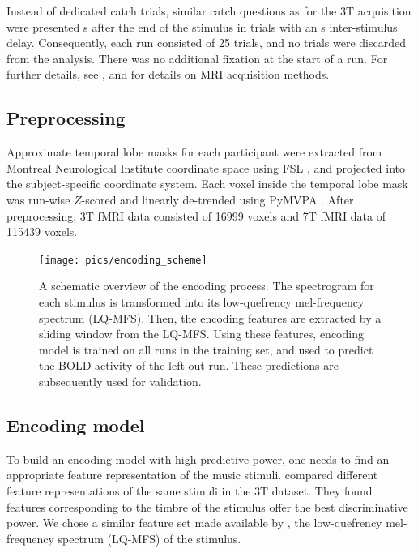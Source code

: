 Instead of dedicated catch trials, similar catch questions as for the 3T
acquisition were presented \unit[4]{s} after the end of the stimulus in trials
with an \unit[8]{s} inter-stimulus delay. Consequently, each run consisted of
25 trials, and no trials were discarded from the analysis.  There was no
additional fixation at the start of a run. For further details, see
\citet{HDH+2015}, and \citet{HBI+14} for details on MRI acquisition methods.


\subsection*{Preprocessing}

Approximate temporal lobe masks for each participant were extracted from
Montreal Neurological Institute coordinate space using FSL
\citep{SJB+04,JBB+12}, and projected into the subject-specific coordinate
system. 
Each voxel inside the temporal lobe mask was run-wise $Z$-scored and
linearly de-trended using PyMVPA \citep{HHS09b}. 
After preprocessing, 3T f{MRI} data consisted of 16999 voxels and 7T f{MRI} data of
115439 voxels.

\begin{figure}
  \centering
  \texttt{[image: pics/encoding\_scheme]}

  \caption{A schematic overview of the encoding process. The spectrogram for
    each stimulus is transformed into its low-quefrency mel-frequency spectrum
    (LQ-MFS). Then, the encoding features are extracted by a sliding window
    from the LQ-MFS. Using these features, encoding model is trained on all
    runs in the training set, and used to predict the BOLD activity of the
  left-out run.  These predictions are subsequently used for validation.}

 \label{fig:encoding_scheme}
\end{figure}

\subsection*{Encoding model}

To build an encoding model with high predictive power, one needs to find an
appropriate feature representation of the music stimuli.  \citet{CTK+2012}
compared different feature representations of the same stimuli in the
3T dataset. They found features corresponding to the timbre of the
stimulus offer the best discriminative power. We chose a similar feature set made
available by \citet{HDH+2015}, the low-quefrency mel-frequency spectrum
(LQ-MFS) of the stimulus.

